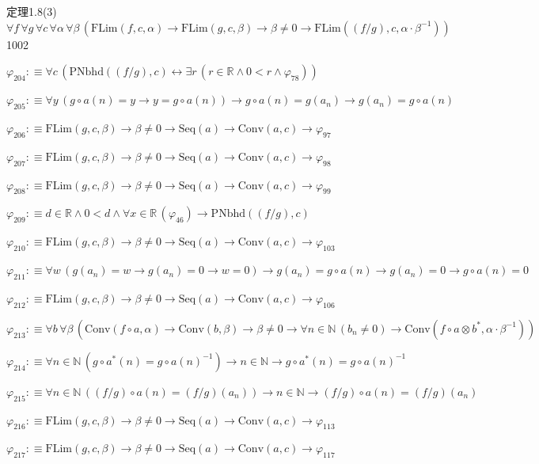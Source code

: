\begin{fullproof}{定理1.8(3)}{$\forall f\,\forall g\,\forall c\,\forall \alpha\,\forall \beta\,(\mathrm{FLim}(f,c,\alpha) \to \mathrm{FLim}(g,c,\beta) \to \beta \neq 0 \to \mathrm{FLim}((f / g),c,\alpha \cdot \beta^{-1}))$}{1002}
\begin{abbrevlist}
\item $\varphi_{204} :\equiv \forall c\,(\mathrm{PNbhd}((f / g),c) \leftrightarrow \exists r\,(r \in \mathbb{R} \land 0 < r \land \varphi_{78}))$
\item $\varphi_{205} :\equiv \forall y\,(g \circ a(n) = y \to y = g \circ a(n)) \to g \circ a(n) = g(a_{n}) \to g(a_{n}) = g \circ a(n)$
\item $\varphi_{206} :\equiv \mathrm{FLim}(g,c,\beta) \to \beta \neq 0 \to \mathrm{Seq}(a) \to \mathrm{Conv}(a,c) \to \varphi_{97}$
\item $\varphi_{207} :\equiv \mathrm{FLim}(g,c,\beta) \to \beta \neq 0 \to \mathrm{Seq}(a) \to \mathrm{Conv}(a,c) \to \varphi_{98}$
\item $\varphi_{208} :\equiv \mathrm{FLim}(g,c,\beta) \to \beta \neq 0 \to \mathrm{Seq}(a) \to \mathrm{Conv}(a,c) \to \varphi_{99}$
\item $\varphi_{209} :\equiv d \in \mathbb{R} \land 0 < d \land \forall x \in \mathbb{R}\,(\varphi_{46}) \to \mathrm{PNbhd}((f / g),c)$
\item $\varphi_{210} :\equiv \mathrm{FLim}(g,c,\beta) \to \beta \neq 0 \to \mathrm{Seq}(a) \to \mathrm{Conv}(a,c) \to \varphi_{103}$
\item $\varphi_{211} :\equiv \forall w\,(g(a_{n}) = w \to g(a_{n}) = 0 \to w = 0) \to g(a_{n}) = g \circ a(n) \to g(a_{n}) = 0 \to g \circ a(n) = 0$
\item $\varphi_{212} :\equiv \mathrm{FLim}(g,c,\beta) \to \beta \neq 0 \to \mathrm{Seq}(a) \to \mathrm{Conv}(a,c) \to \varphi_{106}$
\item $\varphi_{213} :\equiv \forall b\,\forall \beta\,(\mathrm{Conv}(f \circ a,\alpha) \to \mathrm{Conv}(b,\beta) \to \beta \neq 0 \to \forall n \in \mathbb{N}\,(b_{n} \neq 0) \to \mathrm{Conv}(f \circ a \otimes b^{\ast},\alpha \cdot \beta^{-1}))$
\item $\varphi_{214} :\equiv \forall n \in \mathbb{N}\,(g \circ a^{\ast}(n) = g \circ a(n)^{-1}) \to n \in \mathbb{N} \to g \circ a^{\ast}(n) = g \circ a(n)^{-1}$
\item $\varphi_{215} :\equiv \forall n \in \mathbb{N}\,((f / g) \circ a(n) = (f / g)(a_{n})) \to n \in \mathbb{N} \to (f / g) \circ a(n) = (f / g)(a_{n})$
\item $\varphi_{216} :\equiv \mathrm{FLim}(g,c,\beta) \to \beta \neq 0 \to \mathrm{Seq}(a) \to \mathrm{Conv}(a,c) \to \varphi_{113}$
\item $\varphi_{217} :\equiv \mathrm{FLim}(g,c,\beta) \to \beta \neq 0 \to \mathrm{Seq}(a) \to \mathrm{Conv}(a,c) \to \varphi_{117}$

\end{abbrevlist}
\end{fullproof}
